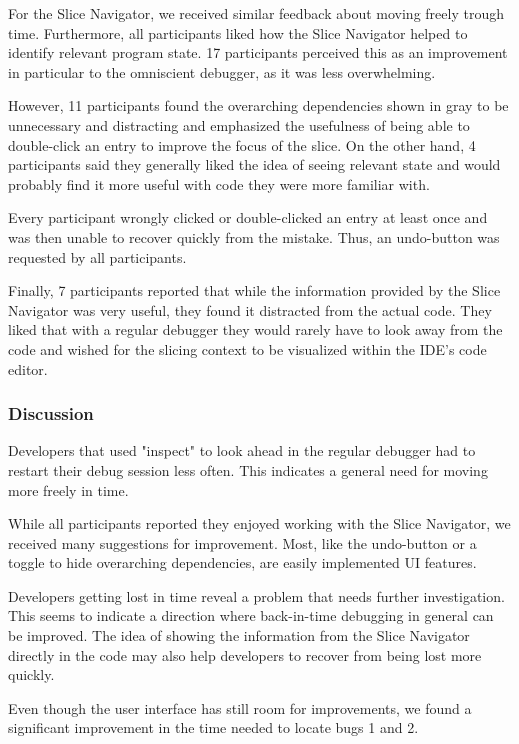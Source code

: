 For the Slice Navigator, we received similar feedback about moving freely trough time.
Furthermore, all participants liked how the Slice Navigator helped to identify relevant program state.
17 participants perceived this as an improvement in particular to the omniscient debugger, as it was less overwhelming.

However, 11 participants found the overarching dependencies shown in gray to be unnecessary and distracting and emphasized the usefulness of being able to double-click an entry to improve the focus of the slice.
On the other hand, 4 participants said they generally liked the idea of seeing relevant state and would probably find it more useful with code they were more familiar with.

Every participant wrongly clicked or double-clicked an entry at least once and was then unable to recover quickly from the mistake.
Thus, an undo-button was requested by all participants.

Finally, 7 participants reported that while the information provided by the Slice Navigator was very useful, they found it distracted from the actual code.
They liked that with a regular debugger they would rarely have to look away from the code and wished for the slicing context to be visualized within the IDE's code editor.

\subsubsection{Discussion}

Developers that used "inspect" to look ahead in the regular debugger had to restart their debug session less often.
This indicates a general need for moving more freely in time.

While all participants reported they enjoyed working with the Slice Navigator, we received many suggestions for improvement.
Most, like the undo-button or a toggle to hide overarching dependencies, are easily implemented UI features.

Developers getting lost in time reveal a problem that needs further investigation.
This seems to indicate a direction where back-in-time debugging in general can be improved.
The idea of showing the information from the Slice Navigator directly in the code may also help developers to recover from being lost more quickly.

Even though the user interface has still room for improvements, we found a significant improvement in the time needed to locate bugs 1 and 2.

